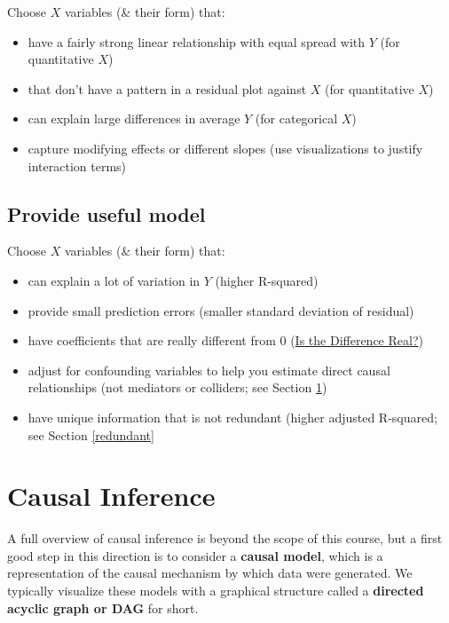 \documentclass[
]{book}
\providecommand{\tightlist}{%
  \setlength{\itemsep}{0pt}\setlength{\parskip}{0pt}}
\begin{document}
Choose \(X\) variables (\& their form) that:

\begin{itemize}
\tightlist
\item
  have a fairly strong linear relationship with equal spread with \(Y\) (for quantitative \(X\))
\item
  that don't have a pattern in a residual plot against \(X\) (for quantitative \(X\))
\item
  can explain large differences in average \(Y\) (for categorical \(X\))
\item
  capture modifying effects or different slopes (use visualizations to justify interaction terms)
\end{itemize}

\hypertarget{provide-useful-model}{%
\subsection{Provide useful model}\label{provide-useful-model}}

Choose \(X\) variables (\& their form) that:

\begin{itemize}
\tightlist
\item
  can explain a lot of variation in \(Y\) (higher R-squared)
\item
  provide small prediction errors (smaller standard deviation of residual)
\item
  have coefficients that are really different from 0 (\protect\hyperlink{is-the-difference-real}{Is the Difference Real?})
\item
  adjust for confounding variables to help you estimate direct causal relationships (not mediators or colliders; see Section \ref{dag})
\item
  have unique information that is not redundant (higher adjusted R-squared; see Section \ref{redundant}
\end{itemize}

\hypertarget{dag}{%
\section{Causal Inference}\label{dag}}

A full overview of causal inference is beyond the scope of this course, but a first good step in this direction is to consider a \textbf{causal model}, which is a representation of the causal mechanism by which data were generated. We typically visualize these models with a graphical structure called a \textbf{directed acyclic graph or DAG} for short.
\end{document}
